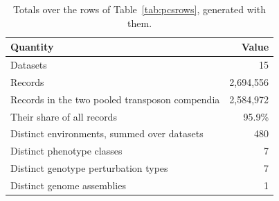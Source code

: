 \begingroup
\footnotesize
\begin{longtable}{@{}L{86mm} r@{}}
\caption[]{Totals over the rows of Table~\ref{tab:pcsrows}, generated with them.}\label{tab:pcscounts}\\
\toprule
\textbf{Quantity} & \textbf{Value} \\
\midrule
\endfirsthead
\bottomrule
\endfoot
Datasets & 15 \\
Records & 2,694,556 \\
Records in the two pooled transposon compendia & 2,584,972 \\
Their share of all records & 95.9\% \\
Distinct environments, summed over datasets & 480 \\
Distinct phenotype classes & 7 \\
Distinct genotype perturbation types & 7 \\
Distinct genome assemblies & 1 \\
\end{longtable}
\endgroup
